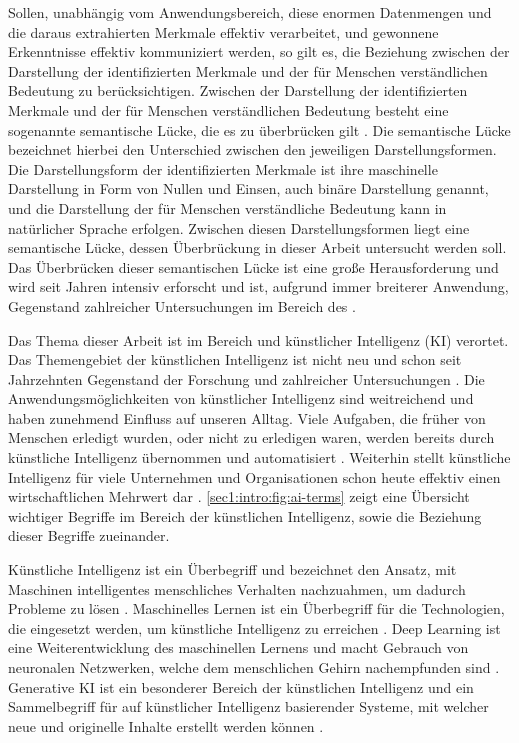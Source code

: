 Sollen, unabhängig vom Anwendungsbereich, diese enormen Datenmengen und die daraus extrahierten Merkmale effektiv verarbeitet, und gewonnene Erkenntnisse effektiv kommuniziert werden, so gilt es, die Beziehung zwischen der Darstellung der identifizierten Merkmale und der für Menschen verständlichen Bedeutung zu berücksichtigen.
Zwischen der Darstellung der identifizierten Merkmale und der für Menschen verständlichen Bedeutung besteht eine sogenannte semantische Lücke, die es zu überbrücken gilt \cite{bridging-semantic-gap}.
Die semantische Lücke bezeichnet hierbei den Unterschied zwischen den jeweiligen Darstellungsformen.
Die Darstellungsform der identifizierten Merkmale ist ihre maschinelle Darstellung in Form von Nullen und Einsen, auch binäre Darstellung genannt, und die Darstellung der für Menschen verständliche Bedeutung kann in natürlicher Sprache erfolgen.
Zwischen diesen Darstellungsformen liegt eine semantische Lücke, dessen Überbrückung in dieser Arbeit untersucht werden soll.
Das Überbrücken dieser semantischen Lücke ist eine große Herausforderung und wird seit Jahren intensiv erforscht und ist, aufgrund immer breiterer Anwendung, Gegenstand zahlreicher Untersuchungen im Bereich des \mmiri{} \cite{bridging-semantic-gap}.

\clearpage

Das Thema dieser Arbeit ist im Bereich \mmir{} und künstlicher Intelligenz (KI) verortet.
Das Themengebiet der künstlichen Intelligenz ist nicht neu und schon seit Jahrzehnten Gegenstand der Forschung und zahlreicher Untersuchungen \cite{harvard-history-ai-research}.
Die Anwendungsmöglichkeiten von künstlicher Intelligenz sind weitreichend und haben zunehmend Einfluss auf unseren Alltag.
Viele Aufgaben, die früher von Menschen erledigt wurden, oder nicht zu erledigen waren, werden bereits durch künstliche Intelligenz übernommen und automatisiert \cite{ai-anwendungsbereiche}.
Weiterhin stellt künstliche Intelligenz für viele Unternehmen und Organisationen schon heute effektiv einen wirtschaftlichen Mehrwert dar \cite{ai-anwendungsbereiche}.
\cref{sec1:intro:fig:ai-terms} zeigt eine Übersicht wichtiger Begriffe im Bereich der künstlichen Intelligenz, sowie die Beziehung dieser Begriffe zueinander.
\par

\noindent
Künstliche Intelligenz ist ein Überbegriff und bezeichnet den Ansatz, mit Maschinen intelligentes menschliches Verhalten nachzuahmen, um dadurch Probleme zu lösen \cite{ai-ml-dl}.
Maschinelles Lernen ist ein Überbegriff für die Technologien, die eingesetzt werden, um künstliche Intelligenz zu erreichen \cite{ai-ml-dl}.
Deep Learning ist eine Weiterentwicklung des maschinellen Lernens und macht Gebrauch von neuronalen Netzwerken, welche dem menschlichen Gehirn nachempfunden sind \cite{ai-ml-dl}.
Generative KI ist ein besonderer Bereich der künstlichen Intelligenz und ein Sammelbegriff für auf künstlicher Intelligenz basierender Systeme, mit welcher neue und originelle Inhalte erstellt werden können \cite{gen-ai-definition}.

